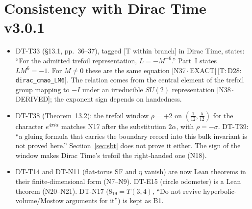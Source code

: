 \documentclass[11pt]{article}
\theoremstyle{definition}
\newcommand{\lean}[1]{\texttt{\small #1}}
\newcommand{\dtag}[1]{#1}
\begin{document}
\section{Consistency with Dirac Time v3.0.1}\label{sec:dtcheck}
\begin{itemize}[leftmargin=2em]
\item DT-T33 (\S13.1, pp.~36--37), tagged [T within branch] in Dirac Time, states: ``For the admitted trefoil representation, $L=-M^{-6}$.'' Part~I states $LM^6=-1$. For $M\neq0$ these are the same equation \dtag{\textsf{\small[N37\,$\cdot$\,EXACT]}\,\textsf{\small[T:\,D28:\,\lean{dirac\_\allowbreak{}cmao\_\allowbreak{}LM6}]}}. The relation comes from the central element of the trefoil group mapping to $-I$ under an irreducible $SU(2)$ representation \cite{Klassen} \dtag{\textsf{\small[N38\,$\cdot$\,DERIVED]}}; the exponent sign depends on handedness.
\item DT-T38 (Theorem~13.2): the trefoil window $\rho=+2$ on $(\tfrac1{12},\tfrac5{12})$ for the character $e^{4\pi i\alpha}$ matches N17 after the substitution $2\alpha$, with $\rho=-\sigma$. DT-T39: ``a gluing formula that carries the boundary record into this bulk invariant is not proved here.'' Section~\ref{sec:sbt} does not prove it either. The sign of the window makes Dirac Time's trefoil the right-handed one (N18).
\item DT-T14 and DT-N11 (flat-torus SF and $\eta$ vanish) are now Lean theorems in their finite-dimensional form (N7--N9). DT-E15 (circle odometer) is a Lean theorem (N20--N21). DT-N17 ($8_{19}=T(3,4)$, ``Do not revive hyperbolic-volume/Mostow arguments for it'') is kept as B1.
\end{itemize}
\end{document}
